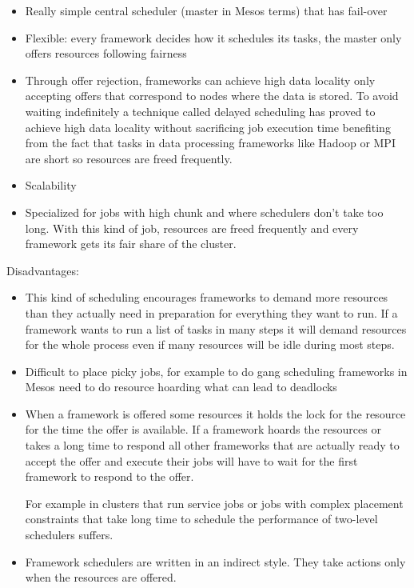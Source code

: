 \documentclass{report}                     %
\begin{document}
\begin{itemize}
  \item
  Really simple central scheduler (master in Mesos terms) that has
  fail-over 
 \item
  Flexible: every framework decides how it schedules its tasks, the
  master only offers resources following fairness 
 \item
  Through offer rejection, frameworks can achieve high data locality
  only accepting offers that correspond to nodes where the data is
  stored. To avoid waiting indefinitely a technique called delayed
  scheduling \cite{zaharia_delay_2010} has proved to achieve high data locality without
  sacrificing job execution time benefiting from the fact that tasks in
  data processing frameworks like Hadoop or MPI are short so resources
  are freed frequently.
 \item Scalability
 \item Specialized for jobs with high chunk and where schedulers don't take
too long. With this kind of job, resources are freed frequently and
every framework gets its fair share of the cluster.
\end{itemize}

Disadvantages:

\begin{itemize}
 \item This kind of scheduling encourages frameworks to demand more
   resources than they actually need in preparation for everything
   they want to run. If a framework wants to run a list of tasks in
   many steps it will demand resources for the whole process even if
   many resources will be idle during most steps.
 \item Difficult to place picky jobs, for example to do gang scheduling
frameworks in Mesos need to do resource hoarding what can lead to
deadlocks
 \item When a framework is offered some resources it
holds the lock for the resource for the time the offer is
available. If a framework hoards the resources or takes a long
time to respond all other frameworks that are actually ready to accept
the offer and execute their jobs will have to wait for the first
framework to respond to the offer.

For example in clusters that run service jobs or jobs with complex
placement constraints that take long time to schedule the performance
of two-level schedulers suffers.

 \item Framework schedulers are written in an indirect style. They
  take actions only when the resources are offered. 
\end{itemize}
\end{document}
